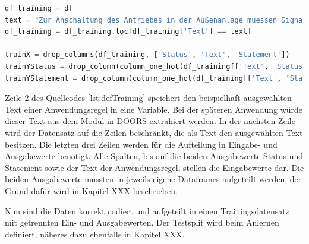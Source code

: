 \begin{lstlisting}[language = python, caption={Definieren des Trainingsdatensatzes},captionpos=b, label = lst:defTraining, floatplacement=H]
df_training = df
text = "Zur Anschaltung des Antriebes in der Außenanlage muessen Signalkabel nach VDE 0816/2 oder Kabel mit vergleichbaren Eigenschaften verwendet werden. Die Verlegevorschriften des Kabels sind einzuhalten."
df_training = df_training.loc[df_training['Text'] == text]

trainX = drop_columns(df_training, ['Status', 'Text', 'Statement'])
trainYStatus = drop_column(column_one_hot(df_training[['Text', 'Status']], ['Status']), "Text")
trainYStatement = drop_column(column_one_hot(df_training[['Text', 'Statement']], ['Statement']), "Text")
\end{lstlisting}

Zeile 2 des Quellcodes \ref*{lst:defTraining} speichert den beispielhaft ausgewählten Text einer Anwendungsregel in eine Variable. Bei der späteren Anwendung würde dieser Text
aus dem Modul in \ac{DOORS} extrahiert werden. In der nächsten Zeile wird der Datensatz auf die Zeilen beschränkt, die als Text den ausgewählten Text besitzen.
Die letzten drei Zeilen werden für die Aufteilung in Eingabe- und Ausgabewerte benötigt. Alle Spalten, bis auf die beiden Ausgabewerte \glqq Status\grqq{} und 
\glqq Statement\grqq{} sowie der Text der Anwendungsregel, stellen die Eingabewerte dar. Die beiden Ausgabewerte mussten in jeweils eigene Dataframes aufgeteilt werden, 
der Grund dafür wird in Kapitel XXX beschrieben.

Nun sind die Daten korrekt codiert und aufgeteilt in einen Trainingsdatensatz mit getrennten Ein- und Ausgabewerten. Der Testsplit wird beim Anlernen definiert, näheres dazu ebenfalls in Kapitel XXX.